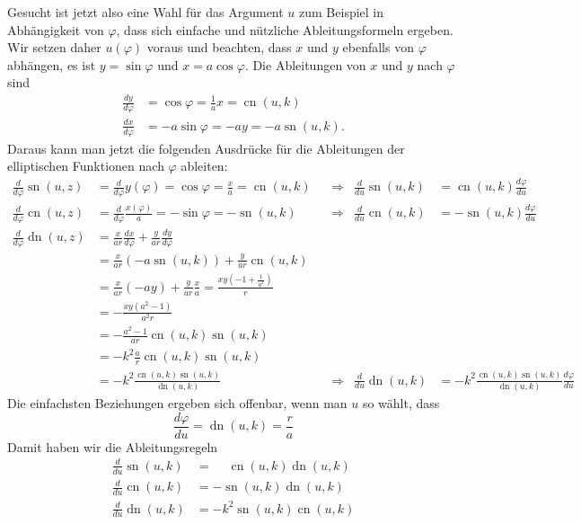 Gesucht ist jetzt also eine Wahl für das Argument $u$ zum Beispiel in
Abhängigkeit von $\varphi$, dass sich einfache und nützliche
Ableitungsformeln ergeben.
Wir setzen daher $u(\varphi)$ voraus und beachten, dass $x$ und $y$
ebenfalls von $\varphi$ abhängen, es ist
$y=\sin\varphi$ und $x=a\cos\varphi$.
Die Ableitungen von $x$ und $y$ nach $\varphi$ sind
\begin{align*}
\frac{dy}{d\varphi}
&=
\cos\varphi
=
\frac{1}{a} x
=
\operatorname{cn}(u,k)
\\
\frac{dx}{d\varphi}
&=
-a\sin\varphi
=
-a y
=
-a\operatorname{sn}(u,k).
\end{align*}
Daraus kann man jetzt die folgenden Ausdrücke für die Ableitungen der
elliptischen Funktionen nach $\varphi$ ableiten:
\begin{align*}
\frac{d}{d\varphi} \operatorname{sn}(u,z)
&=
\frac{d}{d\varphi} y(\varphi)
=
\cos\varphi
=
\frac{x}{a}
=
\operatorname{cn}(u,k)
&&\Rightarrow&
\frac{d}{du}
\operatorname{sn}(u,k)
&=
\operatorname{cn}(u,k) \frac{d\varphi}{du}
\\
\frac{d}{d\varphi} \operatorname{cn}(u,z)
&=
\frac{d}{d\varphi} \frac{x(\varphi)}{a}
=
-\sin\varphi
=
-\operatorname{sn}(u,k)
&&\Rightarrow&
\frac{d}{du}\operatorname{cn}(u,k)
&=
-\operatorname{sn}(u,k) \frac{d\varphi}{du}
\\
\frac{d}{d\varphi} \operatorname{dn}(u,z)
&=
\frac{x}{ar} \frac{dx}{d\varphi}
+
\frac{y}{ar} \frac{dy}{d\varphi}
\\
&=
\frac{x}{ar} (-a\operatorname{sn}(u,k))
+
\frac{y}{ar} \operatorname{cn}(u,k)
\\
&=
\frac{x}{ar}(-ay)
+
\frac{y}{ar} \frac{x}{a}
=
\frac{xy(-1+\frac{1}{a^2})}{r} 
\\
&=
-\frac{xy(a^2-1)}{a^2r} 
\\
&=
-\frac{a^2-1}{ar}
\operatorname{cn}(u,k) \operatorname{sn}(u,k)
\\
&=-k^2
\frac{a}{r}
\operatorname{cn}(u,k) \operatorname{sn}(u,k)
\\
&=
-k^2\frac{\operatorname{cn}(u,k)\operatorname{sn}(u,k)}{\operatorname{dn}(u,k)}
&&\Rightarrow&
\frac{d}{du} \operatorname{dn}(u,k)
&=
-k^2\frac{\operatorname{cn}(u,k)
\operatorname{sn}(u,k)}{\operatorname{dn}(u,k)}
\frac{d\varphi}{du}
\end{align*}
Die einfachsten Beziehungen ergeben sich offenbar, wenn man $u$ so
wählt, dass
\[
\frac{d\varphi}{du}
=
\operatorname{dn}(u,k)
=
\frac{r}{a}
\]
Damit haben wir die Ableitungsregeln
\begin{align*}
\frac{d}{du}\operatorname{sn}(u,k)
&=
\phantom{-}\operatorname{cn}(u,k)\operatorname{dn}(u,k)
\\
\frac{d}{du}\operatorname{cn}(u,k)
&=
-\operatorname{sn}(u,k)\operatorname{dn}(u,k)
\\
\frac{d}{du}\operatorname{dn}(u,k)
&=
-k^2\operatorname{sn}(u,k)\operatorname{cn}(u,k)
\end{align*}

